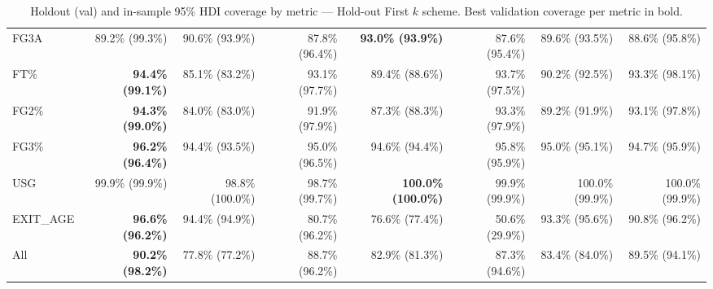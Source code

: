 \begin{table}[H]
{\begin{tabular}{lrrrrrrr}
FG3A & 89.2\% (99.3\%) & 90.6\% (93.9\%) & 87.8\% (96.4\%) & \textbf{93.0\% (93.9\%)} & 87.6\% (95.4\%) & 89.6\% (93.5\%) & 88.6\% (95.8\%) \\
FT\% & \textbf{94.4\% (99.1\%)} & 85.1\% (83.2\%) & 93.1\% (97.7\%) & 89.4\% (88.6\%) & 93.7\% (97.5\%) & 90.2\% (92.5\%) & 93.3\% (98.1\%) \\
FG2\% & \textbf{94.3\% (99.0\%)} & 84.0\% (83.0\%) & 91.9\% (97.9\%) & 87.3\% (88.3\%) & 93.3\% (97.9\%) & 89.2\% (91.9\%) & 93.1\% (97.8\%) \\
FG3\% & \textbf{96.2\% (96.4\%)} & 94.4\% (93.5\%) & 95.0\% (96.5\%) & 94.6\% (94.4\%) & 95.8\% (95.9\%) & 95.0\% (95.1\%) & 94.7\% (95.9\%) \\
USG & 99.9\% (99.9\%) & 98.8\% (100.0\%) & 98.7\% (99.7\%) & \textbf{100.0\% (100.0\%)} & 99.9\% (99.9\%) & 100.0\% (99.9\%) & 100.0\% (99.9\%) \\
EXIT\_AGE & \textbf{96.6\% (96.2\%)} & 94.4\% (94.9\%) & 80.7\% (96.2\%) & 76.6\% (77.4\%) & 50.6\% (29.9\%) & 93.3\% (95.6\%) & 90.8\% (96.2\%) \\
\midrule
All & \textbf{90.2\% (98.2\%)} & 77.8\% (77.2\%) & 88.7\% (96.2\%) & 82.9\% (81.3\%) & 87.3\% (94.6\%) & 83.4\% (84.0\%) & 89.5\% (94.1\%) \\
\bottomrule
\end{tabular}
}
\caption{Holdout (val) and in-sample 95\% HDI coverage by metric --- Hold-out First $k$ scheme. Best validation coverage per metric in bold.}
\label{tab:hdi_coverage_holdout_first_k}
\end{table}

